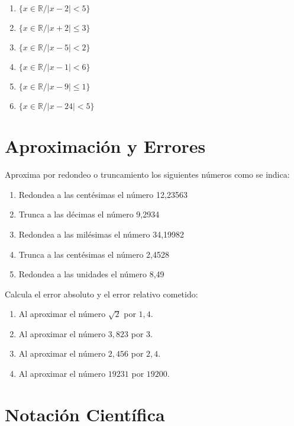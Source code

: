 \begin{enumerate}[topsep=0pt]

	\item $\{x \in \mathbb{R} / |x-2| < 5 \} $

	\item $\{x \in \mathbb{R} / |x+2| \le 3 \} $

	\item $\{x \in \mathbb{R} / |x-5| < 2 \} $

	\item $\{x \in \mathbb{R} / |x-1| < 6 \} $
	\item $\{x \in \mathbb{R} / |x-9| \le 1 \} $
	\item $\{x \in \mathbb{R} / |x-24| < 5 \} $
\end{enumerate}


\section{Aproximación y Errores}

\Exercicio Aproxima por redondeo o truncamiento los siguientes números como se indica:

\begin{enumerate}[topsep=0pt]

	\item Redondea a las centésimas el número 12,23563

	\item Trunca a las décimas el número 9,2934
	\item Redondea a las milésimas el número 34,19982
	\item Trunca a las centésimas el número 2,4528
	\item Redondea a las unidades el número 8,49
\end{enumerate}



\Exercicio Calcula el error absoluto y el error relativo cometido:
\begin{enumerate}
	\item Al aproximar el número $\sqrt{2}$ por $1,4$.
	\item Al aproximar el número $3,823$ por $3$.
	\item Al aproximar el número $2,456$ por $2,4$.
	\item Al aproximar el número $19231$ por $19200$.
\end{enumerate} 



\section{Notación Científica}

